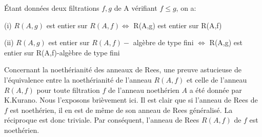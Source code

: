 \documentclass[11pt, twoside]{article}
\begin{document}
Étant données deux filtrations $f,g$ de A vérifiant $f\leq g$, on a:

(i) $R(A,g)$ est entier sur $R(A,f)\Longleftrightarrow $ R(A,g) est entier
sur R(A,f)

(ii) $R(A,g)$ est entier sur $R(A,f)-$ algèbre de type fini $\Longleftrightarrow $ R(A,g) est entier sur R(A,f)-algèbre de type fini

Concernant la noethérianité des anneaux de Rees, une preuve
astucieuse de l'équivalence entre la noethérianité de l'anneau $R(A,f)$ et celle de l'anneau $R(A,f)$ pour toute filtration $f$ de l'anneau
noethérien $A$ a été donnée par K.Kurano. Nous l'exposons brièvement ici. Il est clair que si l'anneau de Rees de $f$ est noethérien, il en est de m\^{e}me de son anneau de Rees généralisé. La réciproque est donc triviale. Par conséquent, l'anneau de Rees $R(A,f)$ de $f$ est noethérien.
\end{document}
